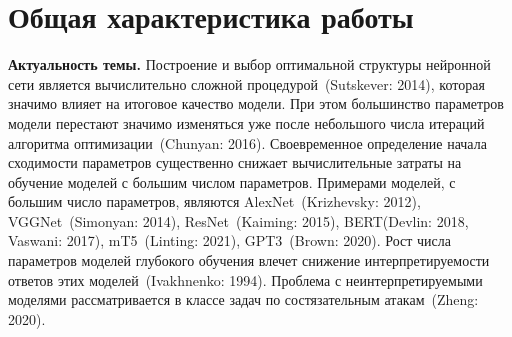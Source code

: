 \documentclass{dissert}
\begin{document}
\clearpage





\section*{Общая характеристика работы}
\textbf{Актуальность темы.}
Построение и выбор оптимальной структуры нейронной сети является вычислительно сложной процедурой~(Sutskever: 2014), которая значимо влияет на итоговое качество модели. 
При этом большинство параметров модели перестают значимо изменяться уже после небольшого числа итераций алгоритма оптимизации~(Chunyan: 2016).
Своевременное определение начала сходимости параметров существенно снижает вычислительные затраты на обучение моделей с большим числом параметров.
Примерами моделей, с большим число параметров, являются AlexNet~(Krizhevsky: 2012), VGGNet~(Simonyan: 2014), ResNet~(Kaiming: 2015), BERT(Devlin: 2018, Vaswani: 2017), mT5~(Linting: 2021), GPT3~(Brown: 2020).
Рост числа параметров моделей глубокого обучения влечет снижение интерпретируемости ответов этих моделей~(Ivakhnenko: 1994).
Проблема с неинтерпретируемыми моделями рассматривается в классе задач по состязательным атакам~(Zheng: 2020).
\end{document}
